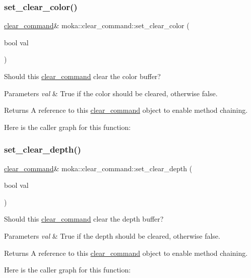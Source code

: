 \subsubsection{\texorpdfstring{set\_clear\_color()}{set\_clear\_color()}}
{\footnotesize\ttfamily \mbox{\hyperlink{classmoka_1_1clear__command}{clear\+\_\+command}}\& moka\+::clear\+\_\+command\+::set\+\_\+clear\+\_\+color (\begin{DoxyParamCaption}\item[{bool}]{val }\end{DoxyParamCaption})}



Should this \mbox{\hyperlink{classmoka_1_1clear__command}{clear\+\_\+command}} clear the color buffer? 


\begin{DoxyParams}{Parameters}
{\em val} & True if the color should be cleared, otherwise false. \\
\hline
\end{DoxyParams}
\begin{DoxyReturn}{Returns}
A reference to this \mbox{\hyperlink{classmoka_1_1clear__command}{clear\+\_\+command}} object to enable method chaining. 
\end{DoxyReturn}
Here is the caller graph for this function\+:
\mbox{\label{classmoka_1_1clear__command_a6d6b5e04ad90cd6117900a8cc78d6a33}} 
\subsubsection{\texorpdfstring{set\_clear\_depth()}{set\_clear\_depth()}}
{\footnotesize\ttfamily \mbox{\hyperlink{classmoka_1_1clear__command}{clear\+\_\+command}}\& moka\+::clear\+\_\+command\+::set\+\_\+clear\+\_\+depth (\begin{DoxyParamCaption}\item[{bool}]{val }\end{DoxyParamCaption})}



Should this \mbox{\hyperlink{classmoka_1_1clear__command}{clear\+\_\+command}} clear the depth buffer? 


\begin{DoxyParams}{Parameters}
{\em val} & True if the depth should be cleared, otherwise false. \\
\hline
\end{DoxyParams}
\begin{DoxyReturn}{Returns}
A reference to this \mbox{\hyperlink{classmoka_1_1clear__command}{clear\+\_\+command}} object to enable method chaining. 
\end{DoxyReturn}
Here is the caller graph for this function\+:
\mbox{\label{classmoka_1_1clear__command_a444e7779e89f6818d99be5a5ec901dc1}} 
